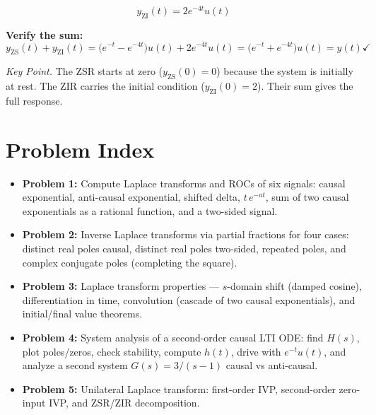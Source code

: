 \documentclass[11pt]{article}
\begin{document}
\begin{equation*}
\boxed{y_{\mathrm{ZI}}(t) = 2 e^{-4t}u(t)}
\end{equation*}

\textbf{Verify the sum:}
\[
y_{\mathrm{ZS}}(t) + y_{\mathrm{ZI}}(t) = \bigl(e^{-t} - e^{-4t}\bigr)u(t) + 2 e^{-4t}u(t)
= \bigl(e^{-t} + e^{-4t}\bigr)u(t) = y(t) \checkmark
\]

\medskip
\noindent\textit{Key Point.} The ZSR starts at zero ($y_{\mathrm{ZS}}(0)=0$) because the system
is initially at rest. The ZIR carries the initial condition ($y_{\mathrm{ZI}}(0)=2$). Their sum
gives the full response.

\section*{Problem Index}

\begin{itemize}[leftmargin=2em]
\item \textbf{Problem 1:} Compute Laplace transforms and ROCs of six signals: causal exponential,
anti-causal exponential, shifted delta, $t\,e^{-at}$, sum of two causal exponentials as a rational
function, and a two-sided signal.
\item \textbf{Problem 2:} Inverse Laplace transforms via partial fractions for four cases: distinct
real poles causal, distinct real poles two-sided, repeated poles, and complex conjugate poles
(completing the square).
\item \textbf{Problem 3:} Laplace transform properties --- $s$-domain shift (damped cosine),
differentiation in time, convolution (cascade of two causal exponentials), and initial/final value
theorems.
\item \textbf{Problem 4:} System analysis of a second-order causal LTI ODE: find $H(s)$, plot
poles/zeros, check stability, compute $h(t)$, drive with $e^{-t}u(t)$, and analyze a second system
$G(s) = 3/(s-1)$ causal vs anti-causal.
\item \textbf{Problem 5:} Unilateral Laplace transform: first-order IVP, second-order zero-input
IVP, and ZSR/ZIR decomposition.
\end{itemize}
\end{document}
